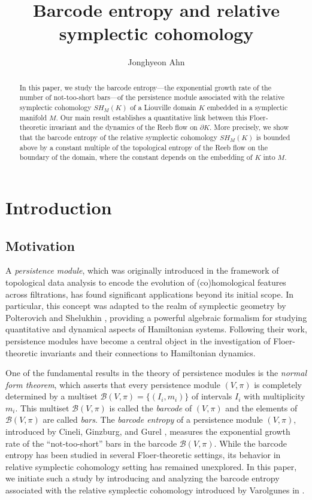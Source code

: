 \documentclass[12pt]{amsart}
\title[Barcode entropy and relative symplectic cohomology]{Barcode entropy and relative symplectic cohomology}
\author[Jonghyeon Ahn]{Jonghyeon Ahn}
\date{}
\theoremstyle{definition}
\begin{document}
\maketitle
\begin{abstract}
    In this paper, we study the barcode entropy—the exponential growth rate of the number of not-too-short bars—of the persistence module associated with the relative symplectic cohomology $SH_M(K)$ of a Liouville domain $K$ embedded in a symplectic manifold $M$. Our main result establishes a quantitative link between this Floer-theoretic invariant and the dynamics of the Reeb flow on $\partial K$. More precisely, we show that the barcode entropy of the relative symplectic cohomology $SH_M(K)$ is bounded above by a constant multiple of the topological entropy of the Reeb flow on the boundary of the domain, where the constant depends on the embedding of $K$ into $M$.
\end{abstract}

\vspace{1cm}

\tableofcontents
\section{Introduction}
\subsection{Motivation}
A \textit{persistence module}, which was originally introduced in the framework of topological data analysis to encode the evolution of (co)homological features across filtrations, has found significant applications beyond its initial scope. In particular, this concept was adapted to the realm of symplectic geometry by Polterovich and Shelukhin \cite{ps}, providing a powerful algebraic formalism for studying quantitative and dynamical aspects of Hamiltonian systems. Following their work, persistence modules have become a central object in the investigation of Floer-theoretic invariants and their connections to Hamiltonian dynamics. 

\vspace{0.2cm}

One of the fundamental results in the theory of persistence modules is the \textit{normal form theorem}, which asserts that every persistence module $(V,\pi)$ is completely determined by a multiset $\mathcal{B}(V,\pi)=\{(I_i,m_i)\}$ of intervals $I_i$ with multiplicity $m_i$. This multiset $\mathcal{B}(V,\pi)$ is called the \textit{barcode} of $(V,\pi)$ and the elements of $\mathcal{B}(V,\pi)$ are called \textit{bars}. The \textit{barcode entropy} of a persistence module $(V,\pi)$, introduced by Cineli, Ginzburg, and Gurel \cite{cgg}, measures the exponential growth rate of the “not-too-short” bars in the barcode $\mathcal{B}(V,\pi)$. While the barcode entropy has been studied in several Floer-theoretic settings, its behavior in relative symplectic cohomology setting has remained unexplored. In this paper, we initiate such a study by introducing and analyzing the barcode entropy associated with the relative symplectic cohomology introduced by Varolgunes in \cite{v}.
\end{document}
